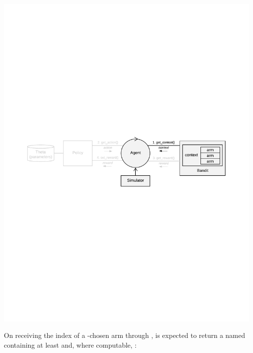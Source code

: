 \documentclass{jss}
\begin{document}
\includegraphics[width=\textwidth]{fig/all_cmab_phases_Part3}

On receiving the index of a -chosen arm through ,  is expected to return a named  containing at least  and, where computable, :
\end{document}
